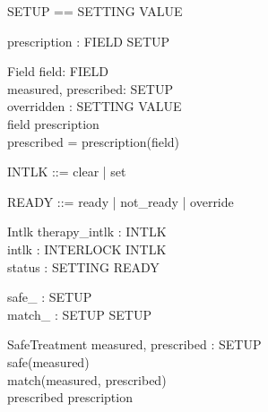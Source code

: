 
\begin{zed}
\end{zed}
\begin{zed}
SETUP == SETTING \fun VALUE
\end{zed}
\begin{axdef}
prescription : FIELD \pfun SETUP
\end{axdef}


\begin{schema}{Field}
field: FIELD \\
measured, prescribed: SETUP \\
overridden : SETTING \pfun VALUE \\
\where field \in \dom prescription \\
prescribed = prescription(field)
\end{schema}

\begin{zed}
[INTERLOCK]
\end{zed}
\begin{zed}
INTLK ::= clear | set
\end{zed}
\begin{zed}
READY ::= ready | not\_ready | override
\end{zed}

\begin{schema}{Intlk}
therapy\_intlk : INTLK \\
intlk : INTERLOCK \fun INTLK \\
status : SETTING \fun READY
\end{schema}

\begin{axdef}
safe\_ : \power SETUP \\
match\_ : SETUP \rel SETUP
\end{axdef}

\begin{schema}{SafeTreatment}
measured, prescribed : SETUP \\
\where safe(measured) \\
match(measured, prescribed) \\
prescribed \in \ran prescription
\end{schema}

